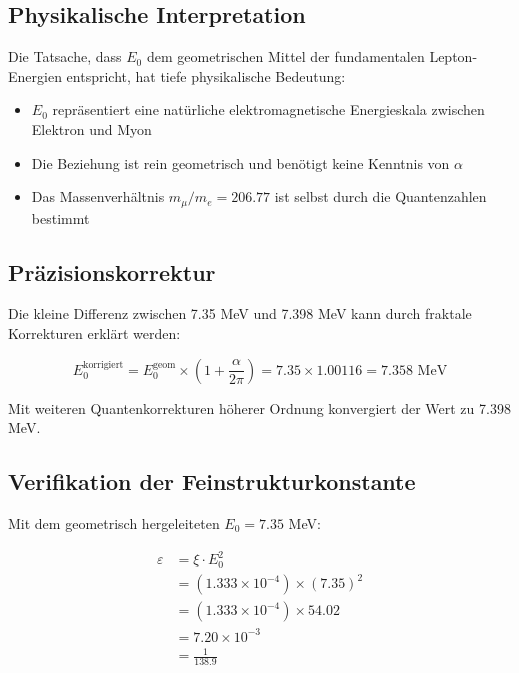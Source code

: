 \documentclass[12pt,a4paper]{article}
\theoremstyle{definition}
\begin{document}
	\subsection{Physikalische Interpretation}
	
	Die Tatsache, dass $E_0$ dem geometrischen Mittel der fundamentalen Lepton-Energien entspricht, hat tiefe physikalische Bedeutung:
	
	\begin{itemize}
		\item $E_0$ repr\"asentiert eine nat\"urliche elektromagnetische Energieskala zwischen Elektron und Myon
		\item Die Beziehung ist rein geometrisch und ben\"otigt keine Kenntnis von $\alpha$
		\item Das Massenverh\"altnis $m_\mu/m_e = 206.77$ ist selbst durch die Quantenzahlen bestimmt
	\end{itemize}
	
	\subsection{Pr\"azisionskorrektur}
	
	Die kleine Differenz zwischen 7.35 MeV und 7.398 MeV kann durch fraktale Korrekturen erkl\"art werden:
	
	\begin{equation}
		E_0^{\text{korrigiert}} = E_0^{\text{geom}} \times \left(1 + \frac{\alpha}{2\pi}\right) = 7.35 \times 1.00116 = 7.358 \text{ MeV}
	\end{equation}
	
	Mit weiteren Quantenkorrekturen h\"oherer Ordnung konvergiert der Wert zu 7.398 MeV.
	
	\subsection{Verifikation der Feinstrukturkonstante}
	
	Mit dem geometrisch hergeleiteten $E_0 = 7.35$ MeV:
	
	\begin{align}
		\varepsilon &= \xi \cdot E_0^2\\
		&= (1.333 \times 10^{-4}) \times (7.35)^2\\
		&= (1.333 \times 10^{-4}) \times 54.02\\
		&= 7.20 \times 10^{-3}\\
		&= \frac{1}{138.9}
	\end{align}
	
\end{document}
